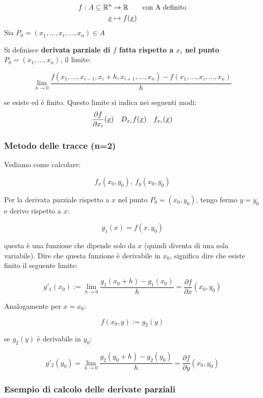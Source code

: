 \begin{align*}
    f: A \subseteq \mathbb{R}^{n} & \to \mathbb{R} \qquad \text{con A definito} \\
    \underline{x}                & \mapsto f(\underline{x})
\end{align*}
Sia \(P_0= (x_1, \ldots, x_{i}, \ldots, x_n) \in A\)

Si definisce \textbf{derivata parziale di \(f\) fatta rispetto a \(x_i\) nel punto \(P_0=(x_1, \ldots ,x_n)\)}, il limite:

\[
    \lim_{ h \to 0 } \frac{f(x_1,\ldots,x_{i-1},x_{i}+h,x_{i+1},\ldots,x_n) - f(x_1,\ldots,x_{i},\ldots,x_n)}{h}
\]

se esiste ed è finito. Questo limite si indica nei seguenti modi:
\begin{align*}
    \frac{\partial f}{\partial x_{i}}(\underline{x}) &  & D_{x_{i}}f(\underline{x}) &  & f_{x_{i}}(\underline{x})
\end{align*}

\filbreak{}
\subsubsection{Metodo delle tracce (n=2)}

Vediamo come calcolare:

\[
    f_x(x_0,y_0) ,\  f_y(x_0,y_0)
\]

Per la derivata parziale rispetto a \(x\) nel punto \(P_0=(x_0,y_0)\), tengo fermo \(y=y_0\) e derivo rispetto a \(x\):

\[
    g_1(x)= f(x,y_0)
\]

questa è una funzione che dipende solo da \(x\) (quindi diventa di una sola variabile). Dire che questa funzione è derivabile in \(x_0\), significa dire che esiste finito il seguente limite:

\[
    g'_1(x_0) := \lim_{ h \to 0 } \frac{g_1(x_0+h)-g_1(x_0)}{h} = \frac{\partial f}{\partial x}(x_0,y_0)
\]

Analogamente per \(x=x_0\):

\[
    f(x_0,y) := g_2(y)
\]

se \(g_2(y)\) è derivabile in \(y_0\):

\[
    g'_2(y_0) = \lim_{ h \to 0 } \frac{g_2(y_0+h)-g_2(y_0)}{h} = \frac{\partial f}{\partial y}(x_0,y_0)
\]

\subsubsection*{Esempio di calcolo delle derivate parziali}

